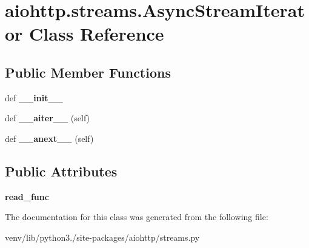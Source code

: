 \hypertarget{classaiohttp_1_1streams_1_1_async_stream_iterator}{}\section{aiohttp.\+streams.\+Async\+Stream\+Iterator Class Reference}
\label{classaiohttp_1_1streams_1_1_async_stream_iterator}
\subsection*{Public Member Functions}
\begin{DoxyCompactItemize}
\item 
\mbox{\label{classaiohttp_1_1streams_1_1_async_stream_iterator_a68b3f2c80a852aeafa8cc764c88b7cec}} 
def {\bfseries \+\_\+\+\_\+init\+\_\+\+\_\+}
\item 
\mbox{\label{classaiohttp_1_1streams_1_1_async_stream_iterator_a455b406101977531af19100443a87000}} 
def {\bfseries \+\_\+\+\_\+aiter\+\_\+\+\_\+} (self)
\item 
\mbox{\label{classaiohttp_1_1streams_1_1_async_stream_iterator_a4914e1f0402b314788b61b3c14c763c1}} 
def {\bfseries \+\_\+\+\_\+anext\+\_\+\+\_\+} (self)
\end{DoxyCompactItemize}
\subsection*{Public Attributes}
\begin{DoxyCompactItemize}
\item 
\mbox{\label{classaiohttp_1_1streams_1_1_async_stream_iterator_a6c3644ce7f177f74a9373243fc5e9943}} 
{\bfseries read\+\_\+func}
\end{DoxyCompactItemize}


The documentation for this class was generated from the following file\+:\begin{DoxyCompactItemize}
\item 
venv/lib/python3./site-\/packages/aiohttp/streams.\+py\end{DoxyCompactItemize}
